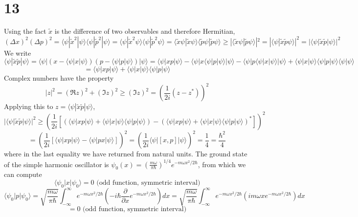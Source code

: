 \documentclass{article}
\begin{document}
\section*{13}
Using the fact $\tilde{x}$ is the difference of two observables and therefore Hermitian,
\[
  (\Delta x)^{2}(\Delta p)^{2}
  =\langle \psi|\tilde{x}^{2}|\psi \rangle\langle \psi|\tilde{p}^{2}|\psi \rangle
  =\langle \psi|\tilde{x}^{2}\psi \rangle\langle \psi|\tilde{p}^{2}\psi \rangle
  =\langle \tilde{x}\psi|\tilde{x}\psi \rangle\langle \tilde{p}\psi|\tilde{p}\psi \rangle
  \geq |\langle \tilde{x}\psi|\tilde{p}\psi \rangle|^{2}
  =|\langle \psi|\tilde{x}\tilde{p}\psi \rangle|^{2}
  =|\langle \psi|\tilde{x}\tilde{p}|\psi \rangle|^{2}
\]
We write
\[
  \langle\psi| \tilde{x}\tilde{p}|\psi\rangle
  =\langle\psi| \left( x-\langle \psi|x|\psi \rangle \right)\left( p-\langle \psi|p|\psi \rangle \right)|\psi\rangle
  =\langle\psi|xp|\psi\rangle-\langle\psi|x\langle \psi|p|\psi \rangle|\psi\rangle-\langle\psi|p\langle \psi|x|\psi
  \rangle|\psi\rangle+\langle \psi|x|\psi \rangle\langle \psi|p|\psi \rangle\langle \psi|\psi \rangle
\]
\[
  =\langle \psi|xp|\psi \rangle+\langle \psi|x|\psi \rangle\langle \psi|p|\psi \rangle
\]
Complex numbers have the property
\[
  |z|^{2}=(\Re z)^{2}+(\Im z)^{2}\geq (\Im z)^{2} = \left( \frac{1}{2i}(z-z^{*}) \right)^{2}
\]
Applying this to $z=\langle \psi|\tilde{x}\tilde{p}|\psi \rangle$,
\[
  |\langle \psi|\tilde{x}\tilde{p}|\psi \rangle|^{2}
  \geq \left( \frac{1}{2i}\left[ (\langle \psi|xp|\psi \rangle+\langle \psi|x|\psi \rangle\langle \psi|p|\psi \rangle)
      -(\langle \psi|xp|\psi \rangle+\langle \psi|x|\psi \rangle\langle \psi|p|\psi \rangle)^{*} \right] \right)^{2}
\]
\[
  =\left( \frac{1}{2i}\left[ \langle \psi|xp|\psi\rangle-\langle \psi|px|\psi \rangle \right] \right)^{2}
  =\left( \frac{1}{2i}\langle \psi|[x,p]|\psi \rangle \right)^{2}
  =\frac{1}{4}
  =\frac{\hbar^{2}}{4}
\]
where in the last equality we have returned from natural units.
The ground state of the simple harmonic oscillator is $\psi_{0}(x)=\left( \frac{m\omega}{\pi\hbar} \right)^{1/4}e^{-m\omega x^{2}/2\hbar}$,
from which we can compute
\[
  \langle \psi_{0}|x|\psi_{0}\rangle =0\textrm{ (odd function, symmetric interval)}
\]
\[
  \langle\psi_{0}|p|\psi_{0}  \rangle=\sqrt{\frac{m\omega}{\pi\hbar}}\int_{-\infty}^{\infty}e^{-m\omega x^{2}/2\hbar}
  \left(-i\hbar\frac{\partial}{\partial x}e^{-m\omega x^{2}/2\hbar}  \right)dx
  =\sqrt{\frac{m\omega}{\pi\hbar}}\int_{-\infty}^{\infty}e^{-m\omega x^{2}/2\hbar}\left( im\omega x e^{-m\omega x^{2}/2\hbar}\right)dx
\]
\[
  =0 \textrm{ (odd function, symmetric interval)}
\]
\end{document}
